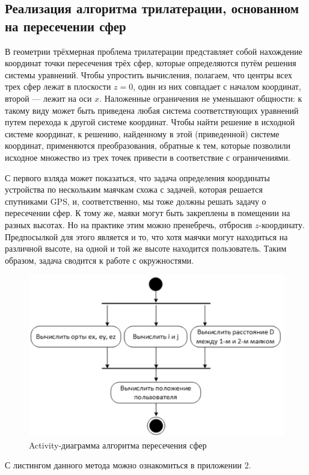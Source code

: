 \subsection{Реализация алгоритма трилатерации, основанном на пересечении сфер}

В геометрии трёхмерная проблема трилатерации представляет собой нахождение координат точки пересечения трёх сфер, которые определяются путём решения системы уравнений. Чтобы упростить вычисления, полагаем, что центры всех трех сфер лежат в плоскости $z=0$, один из них совпадает с началом координат, второй — лежит на оси $x$. Наложенные ограничения не уменьшают общности: к такому виду может быть приведена любая система соответствующих уравнений путем перехода к другой системе координат. Чтобы найти решение в исходной системе координат, к решению, найденному в этой (приведенной) системе координат, применяются преобразования, обратные к тем, которые позволили исходное множество из трех точек привести в соответствие с ограничениями.

С первого взляда может показаться, что задача определения координаты устройства по нескольким маячкам схожа с задачей, которая решается спутниками GPS, и, соответственно, мы тоже должны решать задачу о пересечении сфер. К тому же, маяки могут быть закреплены в помещении на разных высотах. Но на практике этим можно пренебречь, отбросив $z$-координату. Предпосылкой для этого является и то, что хотя маячки могут находиться на различной высоте, на одной и той же высоте находится пользователь. Таким образом, задача сводится к работе с окружностями.

\begin{figure}[ht]
    \centering
    \includegraphics[scale=0.5]{img/sphereIntAct}
    \caption{Activity-диаграмма алгоритма пересечения сфер}
\end{figure}

С листингом данного метода можно ознакомиться в приложении 2.